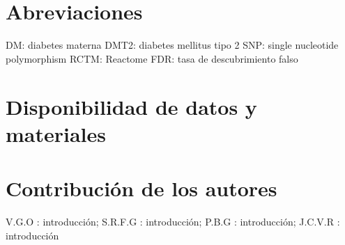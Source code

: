 \documentclass{bmcart}
\begin{document}
\begin{frontmatter}
\begin{abstractbox}
\begin{abstract}
			
			\end{abstract}
			
			
			\begin{keyword}
			\end{keyword}
		
		
		\end{abstractbox}
	
	\end{frontmatter}
	
	
	
	
	
	
	
	
	
	
	
	\begin{backmatter}
	
		\section*{Abreviaciones}%
		DM: diabetes materna
		DMT2: diabetes mellitus tipo 2
		SNP: single nucleotide polymorphism 
		RCTM: Reactome
		FDR: tasa de descubrimiento falso
		
		\section*{Disponibilidad de datos y materiales}%
		
		\section*{Contribución de los autores}
			V.G.O : introducción; S.R.F.G : introducción; P.B.G : introducción; J.C.V.R : introducción
		
		
		
	
	\end{backmatter}
\end{document}
